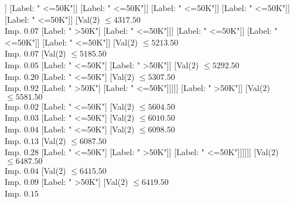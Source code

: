 \documentclass[margin=10pt]{standalone}
\begin{document}
\begin{forest}
																																	[Val($2$) $ \leq 3819.50$ \\ Imp. $0.29$
																																		[Label: " <=50K"]
																																		[Label: " >50K"]]
																																	[Label: " <=50K"]]
																																[Label: " <=50K"]]
																															[Label: " <=50K"]]
																														[Label: " <=50K"]]
																													[Label: " <=50K"]]
																												[Val($2$) $ \leq 4317.50$ \\ Imp. $0.07$
																													[Label: " >50K"]
																													[Label: " <=50K"]]]
																											[Label: " <=50K"]]
																										[Label: " <=50K"]]
																									[Label: " <=50K"]]
																								[Val($2$) $ \leq 5213.50$ \\ Imp. $0.07$
																									[Val($2$) $ \leq 5185.50$ \\ Imp. $0.05$
																										[Label: " <=50K"]
																										[Label: " >50K"]]
																									[Val($2$) $ \leq 5292.50$ \\ Imp. $0.20$
																										[Label: " <=50K"]
																										[Val($2$) $ \leq 5307.50$ \\ Imp. $0.92$
																											[Label: " >50K"]
																											[Label: " <=50K"]]]]]
																							[Label: " >50K"]]
																						[Val($2$) $ \leq 5581.50$ \\ Imp. $0.02$
																							[Label: " <=50K"]
																							[Val($2$) $ \leq 5604.50$ \\ Imp. $0.03$
																								[Label: " <=50K"]
																								[Val($2$) $ \leq 6010.50$ \\ Imp. $0.04$
																									[Label: " <=50K"]
																									[Val($2$) $ \leq 6098.50$ \\ Imp. $0.13$
																										[Val($2$) $ \leq 6087.50$ \\ Imp. $0.28$
																											[Label: " <=50K"]
																											[Label: " >50K"]]
																										[Label: " <=50K"]]]]]]
																					[Val($2$) $ \leq 6487.50$ \\ Imp. $0.04$
																						[Val($2$) $ \leq 6415.50$ \\ Imp. $0.09$
																							[Label: " >50K"]
																							[Val($2$) $ \leq 6419.50$ \\ Imp. $0.15$

\end{forest}
\end{document}
